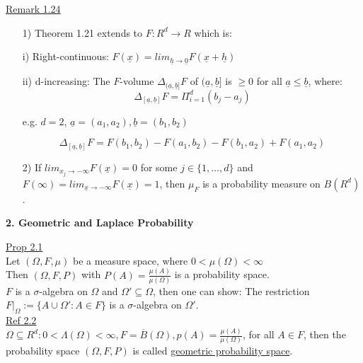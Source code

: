 \documentclass[10pt,letterpaper]{article}
\begin{document}
\underline{Remark 1.24}\\

\begin{enumerate}
\item[1)] Theorem 1.21 extends to $F:R^d\rightarrow R$ which is:
  \item[i)] Right-continuous: $F(\underline{x}) = {lim}_{\underline{h}\rightarrow\underline{0}}
  F(\underline{x}+\underline{h})$
  \item[ii)] d-increasing: The $F$-volume $\Delta_{(\underline{a},\underline{b}]}F$ of 
  $(\underline{a},\underline{b}]$ is $\geq 0$ for all $\underline{a}\leq\underline{b}$, where:\\
  $$\Delta_{[\underline{a},\underline{b}]}F = \Pi_{i=1}^d(b_j-a_j)$$
  \begin{center}e.g. $d=2$, $\underline{a}=(a_1, a_2), \underline{b}=(b_1, b_2)$\end{center}
  $$\Delta_{[\underline{a},\underline{b}]}F = F(b_1, b_2) - F(a_1, b_2) - F(b_1, a_2) + F(a_1, a_2)$$
\item[2)] If ${lim}_{x_j\rightarrow -\infty} F(\underline{x})=0$ for some $j\in\{1,\dots,d\}$ and
$F(\infty)={lim}_{\underline{x}\rightarrow -\infty} F(\underline{x})=1$, then $\mu_F$ is
a probability measure on $B(R^d)$.

\end{enumerate}
\pagebreak

\begin{center}
\textbf{2. Geometric and Laplace Probability}
\end{center}

\underline{Prop 2.1}\\

Let $(\Omega, F, \mu)$ be a measure space, where $0<\mu(\Omega)<\infty$\\

Then $(\Omega, F, P)$ with $P(A)=\frac{\mu(A)}{\mu(\Omega)}$ is a probability space.\\

$F$ is a $\sigma$-algebra on $\Omega$ and $\Omega' \subseteq \Omega$, then one can show: The
restriction $F|_{\Omega}:=\{A\cup \Omega': A\in F\}$ is a $\sigma$-algebra on $\Omega'$.\\

\underline{Ref 2.2}\\

$\Omega\subseteq R^d: 0<\Lambda(\Omega)<\infty, F=\overline{B}(\Omega), 
p(A)=\frac{\mu(A)}{\mu(\Omega)}$, for all $A\in F$, then the probability space $(\Omega, F, P)$ is 
called \underline{geometric probability space}.\\
\end{document}
